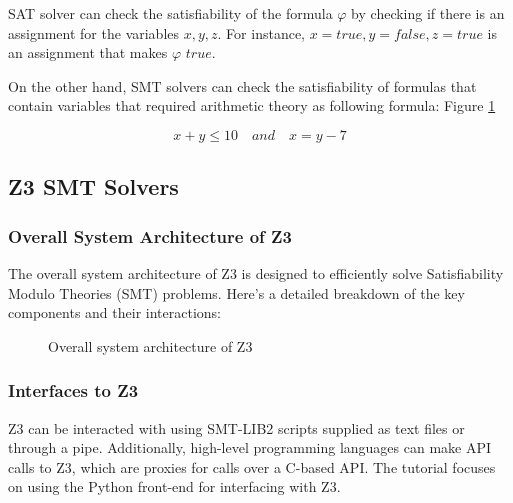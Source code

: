 \documentclass[]{rptuseminar}
\begin{document}
SAT solver can check the satisfiability of the formula \(\varphi\) by checking if there is an assignment for the variables \(x, y, z\).
For instance, \(x = true, y = false, z = true\) is an assignment that makes \(\varphi\) \(true\). 

On the other hand, SMT solvers can check the satisfiability of formulas that contain variables that required arithmetic theory as following formula:
Figure \ref{fig:scholar}

\begin{equation}
  x + y \leq 10 \quad and \quad x = y - 7
\end{equation}

\subsection{Z3 SMT Solvers}
\subsubsection*{Overall System Architecture of Z3}

The overall system architecture of Z3 is designed to efficiently solve Satisfiability Modulo Theories (SMT) problems.
 Here's a detailed breakdown of the key components and their interactions:

 \begin{figure}[ht]
  \begin{center}
  \end{center}
  \caption{%
     Overall system architecture of Z3
    \cite{nikolaj_bjorner_programming_nodate}
  }
  \label{fig:scholar} %
\end{figure}

\subsubsection{Interfaces to Z3}
Z3 can be interacted with using SMT-LIB2 scripts supplied as text files or through a pipe. Additionally,
high-level programming languages can make API calls to Z3, which are proxies for calls over a C-based API.
The tutorial focuses on using the Python front-end for interfacing with Z3.
\cite{nikolaj_bjorner_programming_nodate}
\end{document}

